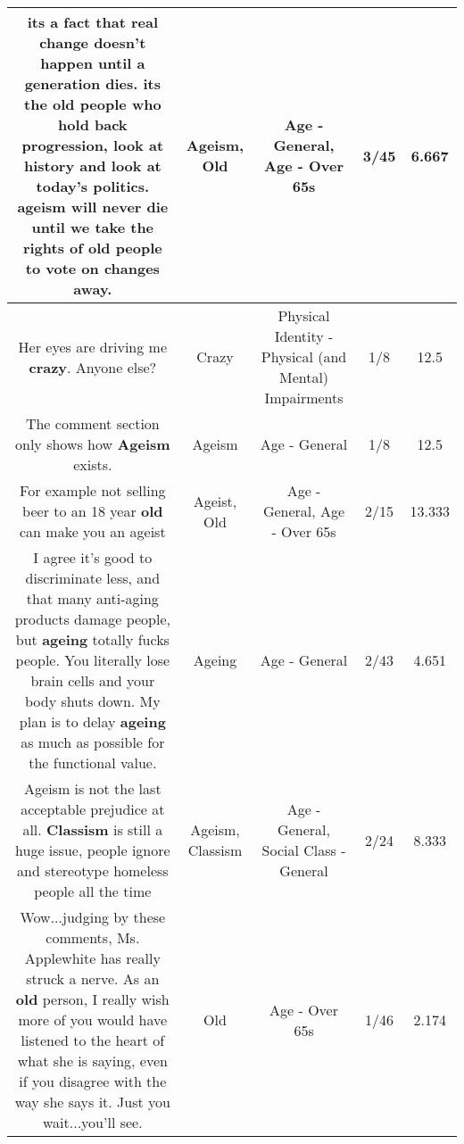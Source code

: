 \documentclass[11pt]{article}
\newlength\mylength
\begin{document}
\begin{center}
\begin{longtable}{|C{.65\mylength}|C{.30\mylength}|C{.12\mylength}|C{.12\mylength}|C{.12\mylength}|}
  \small its a fact that real change doesn't happen until a generation dies. its the \textbf{old} people who hold back progression, look at history and look at today's politics. \textbf{ageism} will never die until we take the rights of \textbf{old} people to vote on changes away.\normalsize   & Ageism, Old & Age - General, Age - Over 65s & 3/45 & 6.667 \\  \hline
  \small Her eyes are driving me \textbf{crazy}. Anyone else?\normalsize   & Crazy & Physical Identity - Physical (and Mental) Impairments & 1/8 & 12.5 \\  \hline
  \small The comment section only shows how \textbf{Ageism} exists.\normalsize   & Ageism & Age - General & 1/8 & 12.5 \\  \hline
  \small For example not selling beer to an 18 year \textbf{old} can make you an ageist\normalsize   & Ageist, Old & Age - General, Age - Over 65s & 2/15 & 13.333 \\  \hline
  \small I agree it's good to discriminate less, and that many anti-aging products damage people, but \textbf{ageing} totally fucks people. You literally lose brain cells and your body shuts down. My plan is to delay \textbf{ageing} as much as possible for the functional value.\normalsize   & Ageing & Age - General & 2/43 & 4.651 \\  \hline
  \small Ageism is not the last acceptable prejudice at all. \textbf{Classism} is still a huge issue, people ignore and stereotype homeless people all the time\normalsize   & Ageism, Classism & Age - General, Social Class - General & 2/24 & 8.333 \\  \hline
  \small Wow...judging by these comments, Ms. Applewhite has really struck a nerve.  As an \textbf{old} person, I really wish more of you would have listened to the heart of what she is saying, even if you disagree with the way she says it.  Just you wait...you'll see.\normalsize   & Old & Age - Over 65s & 1/46 & 2.174 \\  \hline

\end{longtable}
\end{center}
\end{document}
